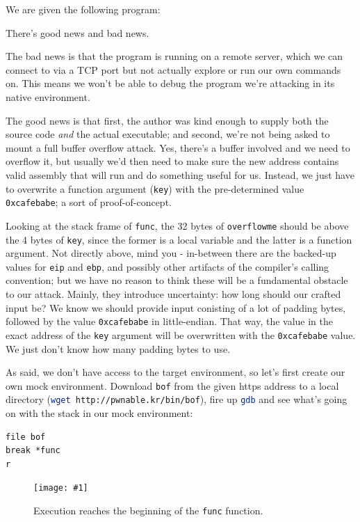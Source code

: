 \documentclass{article}
\newcommand{\displayimagecap}[2] {
\begin{figure}
    \centering
    \texttt{[image: \#1]} 
    \caption{#2}
\end{figure}
}
\newcommand{\xcode}[2]{\colorbox{ubuntuback}{\lstinline[language=#1]|#2|}}
\newcommand{\asm}[1]{\xcode{{[x86masm]assembler}}{#1}}
\newcommand{\code}[1]{\colorbox{ubuntuback}{\texttt{#1}}}
\begin{document}
We are given the following program:



There's good news and bad news.

The bad news is that the program is running on a remote server, which we can connect to via a TCP port but not actually explore or run our own commands on. This means we won't be able to debug the program we're attacking in its native environment.

The good news is that first, the author was kind enough to supply both the source code \textit{and} the actual executable; and second, we're not being asked to mount a full buffer overflow attack. Yes, there's a buffer involved and we need to overflow it, but usually we'd then need to make sure the new address contains valid assembly that will run and do something useful for us. Instead, we just have to overwrite a function argument (\xcode{C}{key}) with the pre-determined value \code{0xcafebabe}; a sort of proof-of-concept.

Looking at the stack frame of \xcode{C}{func}, the 32 bytes of \xcode{C}{overflowme} should be above the 4 bytes of \xcode{C}{key}, since the former is a local variable and the latter is a function argument. Not directly above, mind you - in-between there are the backed-up values for \asm{eip} and \asm{ebp}, and possibly other artifacts of the compiler's calling convention; but we have no reason to think these will be a fundamental obstacle to our attack. Mainly, they introduce uncertainty: how long should our crafted input be? We know we should provide input conisting of a lot of padding bytes, followed by the value \code{0xcafebabe} in little-endian. That way, the value in the exact address of the \xcode{C}{key} argument will be overwritten with the \code{0xcafebabe} value. We just don't know how many padding bytes to use.

As said, we don't have access to the target environment, so let's first create our own mock environment. Download \code{bof} from the given https address to a local directory (\xcode{bash}{wget http://pwnable.kr/bin/bof}), fire up \xcode{bash}{gdb} and see what's going on with the stack in our mock environment:
\begin{lstlisting}
file bof
break *func
r
\end{lstlisting}

\displayimagecap{./exercises/02_bof/func_breakpoint.png}{Execution reaches the beginning of the \code{func} function.}
\end{document}
